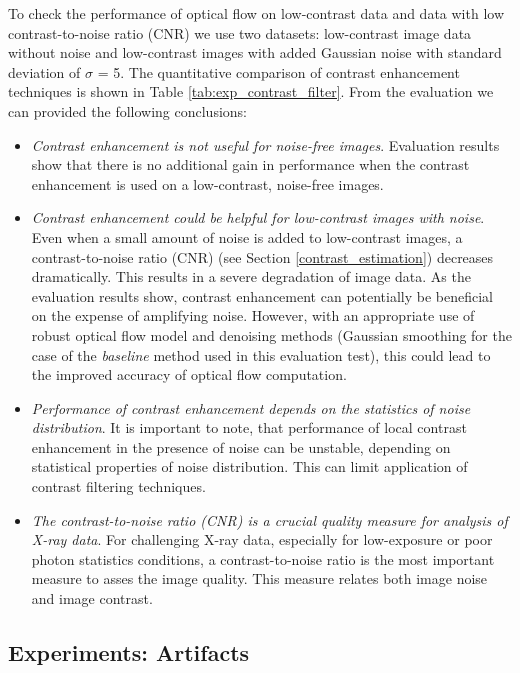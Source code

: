 To check the performance of optical flow on low-contrast data and data with low contrast-to-noise ratio (CNR) we use two datasets: low-contrast image data without noise and low-contrast images with added Gaussian noise with standard deviation of $\sigma$ = 5. 
The quantitative comparison of contrast enhancement techniques is shown in Table \ref{tab:exp_contrast_filter}. From the evaluation we can provided the following conclusions:
\begin{itemize}
	\item \textit{Contrast enhancement is not useful for noise-free images}. Evaluation results show that there is no additional gain in performance when the contrast enhancement is used on a low-contrast, noise-free images.
	    
	\item \textit{Contrast enhancement could be helpful for low-contrast images with noise}. Even when a small amount of noise is added to low-contrast images, a contrast-to-noise ratio (CNR) (see Section \ref{contrast_estimation}) decreases dramatically. This results in a severe degradation of image data. As the evaluation results show, contrast enhancement can potentially be beneficial on the expense of amplifying noise. However, with an appropriate use of robust optical flow model and denoising methods (Gaussian smoothing for the case of the \textit{baseline} method used in this evaluation test), this could lead to the improved accuracy of optical flow computation. 
	
	\item \textit{Performance of contrast enhancement depends on the statistics of noise distribution}. It is important to note, that performance of local contrast enhancement in the presence of noise can be unstable, depending on statistical properties of noise distribution. This can limit application of contrast filtering techniques.

	\item \textit{The contrast-to-noise ratio (CNR) is a crucial quality measure for analysis of X-ray data}. For challenging X-ray data, especially for low-exposure  or poor photon statistics conditions, a contrast-to-noise ratio is the most important measure to asses the image quality. This measure relates both image noise and image contrast. 
\end{itemize}






\subsection{Experiments: Artifacts}
\label{experiments_artifacts}

